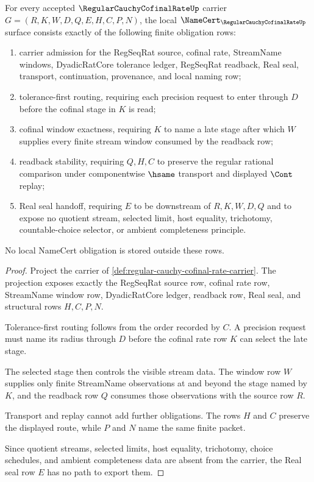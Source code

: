 \begin{theorem}
\label{thm:regular-cauchy-cofinal-rate-namecert-obligations}
For every accepted $\RegularCauchyCofinalRateUp$ carrier $G=(R,K,W,D,Q,E,H,C,P,N)$, the local $\NameCert_{\RegularCauchyCofinalRateUp}$ surface consists exactly of the following finite obligation rows:
\begin{enumerate}
\item carrier admission for the RegSeqRat source, cofinal rate, StreamName windows, DyadicRatCore tolerance ledger, RegSeqRat readback, Real seal, transport, continuation, provenance, and local naming row;
\item tolerance-first routing, requiring each precision request to enter through $D$ before the cofinal stage in $K$ is read;
\item cofinal window exactness, requiring $K$ to name a late stage after which $W$ supplies every finite stream window consumed by the readback row;
\item readback stability, requiring $Q,H,C$ to preserve the regular rational comparison under componentwise $\hsame$ transport and displayed $\Cont$ replay;
\item Real seal handoff, requiring $E$ to be downstream of $R,K,W,D,Q$ and to expose no quotient stream, selected limit, host equality, trichotomy, countable-choice selector, or ambient completeness principle.
\end{enumerate}
No local NameCert obligation is stored outside these rows.
\end{theorem}
\begin{proof}
Project the carrier of \autoref{def:regular-cauchy-cofinal-rate-carrier}. The projection exposes exactly the RegSeqRat source row, cofinal rate row, StreamName window row, DyadicRatCore ledger, readback row, Real seal, and structural rows $H,C,P,N$.

Tolerance-first routing follows from the order recorded by $C$. A precision request must name its radius through $D$ before the cofinal rate row $K$ can select the late stage.

The selected stage then controls the visible stream data. The window row $W$ supplies only finite StreamName observations at and beyond the stage named by $K$, and the readback row $Q$ consumes those observations with the source row $R$.

Transport and replay cannot add further obligations. The rows $H$ and $C$ preserve the displayed route, while $P$ and $N$ name the same finite packet.

Since quotient streams, selected limits, host equality, trichotomy, choice schedules, and ambient completeness data are absent from the carrier, the Real seal row $E$ has no path to export them.
\end{proof}

